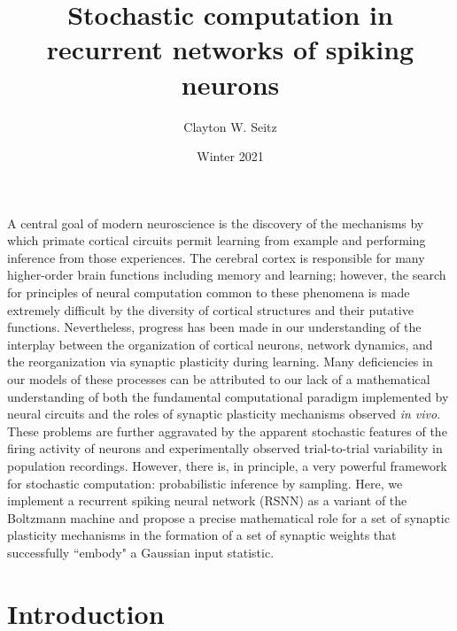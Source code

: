\documentclass{ucetd}
\title{Stochastic computation in recurrent networks of spiking neurons}
\author{Clayton W. Seitz}
\date{Winter 2021}
\begin{document}
\maketitle

\makecopyright
\makeepigraph


\tableofcontents

\acknowledgments

\abstract

A central goal of modern neuroscience is the discovery of the mechanisms by which primate cortical circuits permit learning from example and performing inference from those experiences. The cerebral cortex is responsible for many higher-order brain functions including memory and learning; however, the search for principles of neural computation common to these phenomena is made extremely difficult by the diversity of cortical structures and their putative functions. Nevertheless, progress has been made in our understanding of the interplay between the organization of cortical neurons, network dynamics, and the reorganization via synaptic plasticity during learning. Many deficiencies in our models of these processes can be attributed to our lack of a mathematical understanding of both the fundamental computational paradigm implemented by neural circuits and the roles of synaptic plasticity mechanisms observed \emph{in vivo}. These problems are further aggravated by the apparent stochastic features of the firing activity of neurons and experimentally observed trial-to-trial variability in population recordings. However, there is, in principle, a very powerful framework for stochastic computation: probabilistic inference by sampling. Here, we implement a recurrent spiking neural network (RSNN) as a variant of the Boltzmann machine and propose a precise mathematical role for a set of synaptic plasticity mechanisms in the formation of a set of synaptic weights that successfully ``embody" a Gaussian input statistic.


\mainmatter

\chapter{Introduction}
\end{document}

